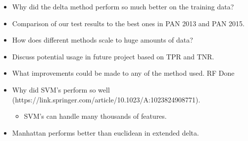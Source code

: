 \begin{itemize}
    \item Why did the delta method perform so much better on the training data?
    \item Comparison of our test results to the best ones in PAN 2013 and PAN
        2015.
    \item How does different methods scale to huge amounts of data?
    \item Discuss potential usage in future project based on TPR and TNR.
    \item What improvements could be made to any of the method used. RF Done
    \item Why did SVM's perform so well (https://link.springer.com/article/10.1023/A:1023824908771).
        \begin{itemize}
            \item SVM's can handle many thousands of features.
        \end{itemize}
    \item Manhattan performs better than euclidean in extended delta.
\end{itemize}
